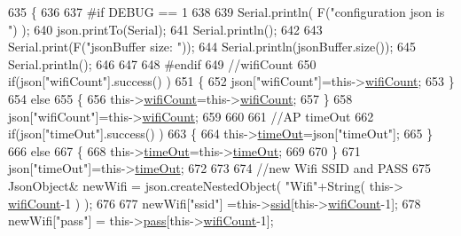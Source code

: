\begin{DoxyCode}
635         \{
636         
637 \textcolor{preprocessor}{        #if DEBUG == 1 }
638         
639             Serial.println( F(\textcolor{stringliteral}{"configuration json is "}) );
640             json.printTo(Serial);
641             Serial.println();
642 
643             Serial.print(F(\textcolor{stringliteral}{"jsonBuffer size: "}));
644             Serial.println(jsonBuffer.size());
645             Serial.println();
646 
647 
648 \textcolor{preprocessor}{        #endif}
649             \textcolor{comment}{//wifiCount}
650             \textcolor{keywordflow}{if}(json[\textcolor{stringliteral}{"wifiCount"}].success() )
651             \{           
652                 json[\textcolor{stringliteral}{"wifiCount"}]=this->\hyperlink{classCoolWifi_ab133bd92fcb895b884deecd6678592e4}{wifiCount};
653             \}
654             \textcolor{keywordflow}{else}
655             \{
656                 this->\hyperlink{classCoolWifi_ab133bd92fcb895b884deecd6678592e4}{wifiCount}=this->\hyperlink{classCoolWifi_ab133bd92fcb895b884deecd6678592e4}{wifiCount};
657             \}
658             json[\textcolor{stringliteral}{"wifiCount"}]=this->\hyperlink{classCoolWifi_ab133bd92fcb895b884deecd6678592e4}{wifiCount};
659 
660             
661             \textcolor{comment}{//AP timeOut}
662             \textcolor{keywordflow}{if}(json[\textcolor{stringliteral}{"timeOut"}].success() )
663             \{
664                 this->\hyperlink{classCoolWifi_a952111605f25156588b5632caaba1c6f}{timeOut}=json[\textcolor{stringliteral}{"timeOut"}];
665             \}
666             \textcolor{keywordflow}{else}
667             \{
668                 this->\hyperlink{classCoolWifi_a952111605f25156588b5632caaba1c6f}{timeOut}=this->\hyperlink{classCoolWifi_a952111605f25156588b5632caaba1c6f}{timeOut};
669 
670             \}
671             json[\textcolor{stringliteral}{"timeOut"}]=this->\hyperlink{classCoolWifi_a952111605f25156588b5632caaba1c6f}{timeOut};
672             
673             
674             \textcolor{comment}{//new Wifi SSID and PASS}
675             JsonObject& newWifi = json.createNestedObject( \textcolor{stringliteral}{"Wifi"}+String( this->
      \hyperlink{classCoolWifi_ab133bd92fcb895b884deecd6678592e4}{wifiCount}-1 ) );
676             
677             newWifi[\textcolor{stringliteral}{"ssid"}] =this->\hyperlink{classCoolWifi_a893b21d0fed821438733bba2e73fb4c2}{ssid}[this->\hyperlink{classCoolWifi_ab133bd92fcb895b884deecd6678592e4}{wifiCount}-1];
678             newWifi[\textcolor{stringliteral}{"pass"}] = this->\hyperlink{classCoolWifi_a0c3332a149245aaad060b32593a54c9b}{pass}[this->\hyperlink{classCoolWifi_ab133bd92fcb895b884deecd6678592e4}{wifiCount}-1];

\end{DoxyCode}
